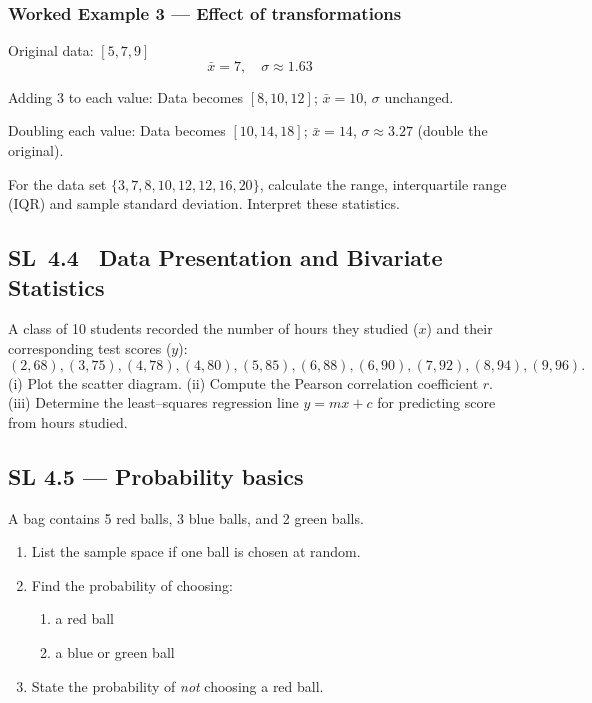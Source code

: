\documentclass[11pt]{article}
\def\textbf#1{#1}%
\newcommand{\tocsubsection}[1]{\subsection{#1}}
\newcounter{question}
\begin{document}
\subsubsection*{Worked Example 3 — Effect of transformations}
Original data: $[5, 7, 9]$  
\[
\bar{x} = 7, \quad \sigma \approx 1.63
\]

\textbf{Adding 3 to each value:}  
Data becomes $[8, 10, 12]$; $\bar{x} = 10$, $\sigma$ unchanged.

\textbf{Doubling each value:}  
Data becomes $[10, 14, 18]$; $\bar{x} = 14$, $\sigma \approx 3.27$ (double the original).


\begin{question}
For the data set $\{3,7,8,10,12,12,16,20\}$, calculate the range,
interquartile range (IQR) and sample standard deviation.  Interpret these
statistics.
\end{question}

\tocsubsection{SL 4.4 \; Data Presentation and Bivariate Statistics}

\begin{question}
A class of 10 students recorded the number of hours they studied ($x$) and
their corresponding test scores ($y$):
\[(2,68),(3,75),(4,78),(4,80),(5,85),(6,88),(6,90),(7,92),(8,94),(9,96).
\]
(i) Plot the scatter diagram.  (ii) Compute the Pearson correlation coefficient
$r$.  (iii) Determine the least–squares regression line $y=mx+c$ for predicting
score from hours studied.
\end{question}


\tocsubsection{SL 4.5 — Probability basics}

\begin{question}
A bag contains 5 red balls, 3 blue balls, and 2 green balls.
\begin{enumerate}
    \item List the sample space if one ball is chosen at random.
    \item Find the probability of choosing:
    \begin{enumerate}
        \item a red ball
        \item a blue or green ball
    \end{enumerate}
    \item State the probability of \emph{not} choosing a red ball.
\end{enumerate}
\end{question}
\end{document}
